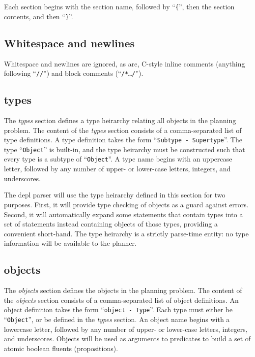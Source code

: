 \documentclass{article}
\begin{document}
\noindent
Each section begins with the section name, followed by
``\verb|{|'', 
then the section contents, and then
``\verb|}|''. 


\subsection{Whitespace and newlines}
Whitespace and newlines are ignored,
as are, C-style inline comments (anything
following ``\texttt{//}'') and block comments (``\texttt{/*\ldots*/}'').


\subsection{types}

The \emph{types} section defines a type heirarchy relating all objects in the planning
problem.
The content of the \emph{types} section consists of a comma-separated list of
type definitions. A type definition takes the form
``\texttt{Subtype - Supertype}''.
The type ``\texttt{Object}'' is built-in, and
the type heirarchy must be constructed such that every type is a subtype of
``\texttt{Object}''.  A type name begins with an uppercase letter, followed
by any number of upper- or lower-case letters, integers, and underscores.

The depl parser will use the type heirarchy defined in this section for two 
purposes. First, it will provide type checking of objects as a guard against errors.
Second, it will automatically expand some
statements that contain types into a set of statements instead containing
objects of those types, providing a convenient short-hand. 
The type heirarchy is a strictly parse-time entity: no type information will be
available to the planner.


\subsection{objects}

The \emph{objects} section defines the objects in the planning problem.
The content of the \emph{objects} section consists of a comma-separated list of
object definitions. An object definition takes the form ``\texttt{object -
Type}''. Each type must
either be ``\texttt{Object}'', or be defined in the \emph{types} section.  An
object name begins with a lowercase letter, followed by any number of upper-
or lower-case letters, integers, and underscores.
Objects will be used as arguments to predicates to build a set of atomic
boolean fluents (propositions).
\end{document}
